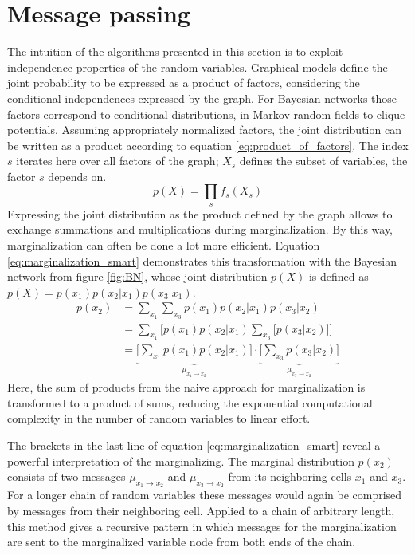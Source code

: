 \documentclass{sigkdd}
\begin{document}
\section{Message passing}\label{chapter:exact_inference}
The intuition of the algorithms presented in this section is to exploit independence properties of the random variables. Graphical models define the joint probability to be expressed as a product of factors, considering the conditional independences expressed by the graph. For Bayesian networks those factors correspond to conditional distributions, in Markov random fields to clique potentials. Assuming appropriately normalized factors, the joint distribution can be written as a product according to equation \ref{eq:product_of_factors}. The index $s$ iterates here over all factors of the graph; $X_s$ defines the subset of variables, the factor $s$ depends on.
\begin{equation}\label{eq:product_of_factors}
p(X)= \prod_{s} f_s(X_s)
\end{equation}
Expressing the joint distribution as the product defined by the graph allows to exchange summations and multiplications during marginalization. By this way, marginalization can often be done a lot more efficient. Equation \ref{eq:marginalization_smart} demonstrates this transformation with the Bayesian network from figure \ref{fig:BN}, whose joint distribution $p(X)$ is defined as $p(X) =  p(x_1) p(x_2|x_1) p(x_3|x_1)$.
\begin{equation}\label{eq:marginalization_smart}
\begin{split}
p(x_2) &= \sum_{x_1} \sum_{x_3} p(x_1) p(x_2|x_1) p(x_3|x_2) \\ &= \sum_{x_1} \Big[  p(x_1) p(x_2|x_1) \sum_{x_3} \Big[ p(x_3|x_2)\Big] \Big] \\ &= \underbrace{\Big[ \sum_{x_1}  p(x_1) p(x_2|x_1)\Big]}_{\mu_{x_1 \rightarrow x_2}}\cdot \underbrace{\Big[ \sum_{x_3}  p(x_3|x_2)\Big]}_{\mu_{x_3 \rightarrow x_2}}
\end{split}
\end{equation}
Here, the sum of products from the naive approach for marginalization is transformed to a product of sums, reducing the exponential computational complexity in the number of random variables to linear effort.

The brackets in the last line of equation \ref{eq:marginalization_smart} reveal a powerful interpretation of the marginalizing. The marginal distribution $p(x_2)$ consists of two messages $\mu_{x_1 \rightarrow x_2}$ and $\mu_{x_3 \rightarrow x_2}$ from its neighboring cells $x_1$ and $x_3$. For a longer chain of random variables these messages would again be comprised by messages from their neighboring cell. Applied to a chain of arbitrary length, this method gives a recursive pattern in which messages for the marginalization are sent to the marginalized variable node from both ends of the chain.  
\end{document}
